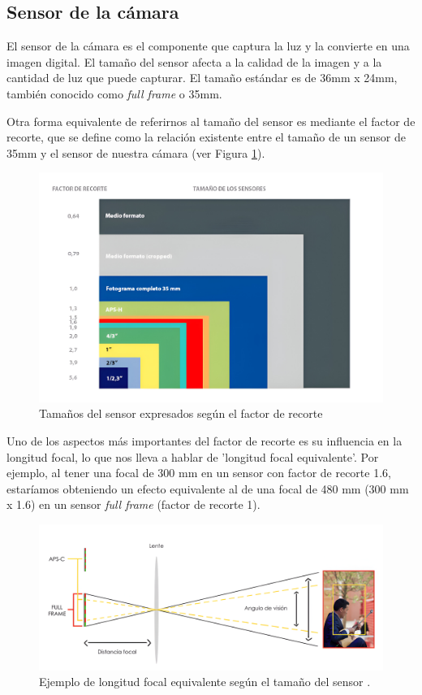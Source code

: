 \subsection*{Sensor de la cámara}
El sensor de la cámara \cite{45,47} es el componente que captura la luz y la convierte en una imagen digital. El tamaño del sensor afecta a la calidad de la imagen y a la cantidad de luz que puede capturar. El tamaño estándar es de 36mm x 24mm, también conocido como \textit{full frame} o 35mm.

Otra forma equivalente de referirnos al tamaño del sensor es mediante el factor de recorte, que se define como la relación existente entre el tamaño de un sensor de 35mm y el sensor de nuestra cámara (ver Figura \ref{fig12}).

\begin{figure}[h]
	\centering
	\includegraphics[scale=0.08]{imagenes/cap2/tam_sensor_factor.jpeg}
	\caption[Tipos de tamaños de sensor.]{Tamaños del sensor expresados según el factor de recorte \cite{48}}
	\label{fig12}
\end{figure}

Uno de los aspectos más importantes del factor de recorte es su influencia en la longitud focal, lo que nos lleva a hablar de 'longitud focal equivalente'. Por ejemplo, al tener una focal de 300 mm en un sensor con factor de recorte 1.6, estaríamos obteniendo un efecto equivalente al de una focal de 480 mm (300 mm x 1.6) en un sensor \textit{full frame} (factor de recorte 1).

\begin{figure}[h]
	\centering
	\includegraphics[scale=0.13]{imagenes/cap2/focal-equivalente.png}
	\caption[Ejemplo de longitud focal equivalente.]{Ejemplo de longitud focal equivalente según el tamaño del sensor \cite{46}.}
	\label{fig13}
\end{figure}


